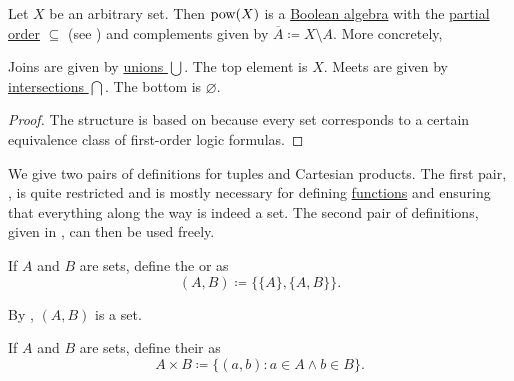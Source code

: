 \begin{proposition}\label{thm:boolean_algebra_of_subsets}
  Let \( X \) be an arbitrary set. Then \( \operatorname{pow}(X) \) is a \hyperref[def:boolean_algebra]{Boolean algebra} with the \hyperref[def:poset]{partial order} \( \subseteq \) (see ) and complements given by \( \overline{A} \coloneqq X \setminus A \). More concretely,
  \begin{thmenum}
     Joins are given by \hyperref[def:set_union]{unions \( \bigcup \)}.
     The top element is \( X \).
     Meets are given by \hyperref[def:set_intersection]{intersections \( \bigcap \)}.
     The bottom is \( \varnothing \).
  \end{thmenum}
\end{proposition}
\begin{proof}
  The structure is based on  because every set corresponds to a certain equivalence class of first-order logic formulas.
\end{proof}

\begin{remark}\label{rem:binary_vs_arbitrary_tuples}
  We give two pairs of definitions for tuples and Cartesian products. The first pair, , is quite restricted and is mostly necessary for defining \hyperref[def:function]{functions} and ensuring that everything along the way is indeed a set. The second pair of definitions, given in , can then be used freely.
\end{remark}

\begin{definition}\label{def:kuratowski_pair}
  If \( A \) and \( B \) are sets, define the  or  as
  \begin{equation*}
    (A, B) \coloneqq \{ \{ A \}, \{ A, B \} \}.
  \end{equation*}

  By , \( (A, B) \) is a set.
\end{definition}

\begin{definition}\label{def:binary_cartesian_product}
  If \( A \) and \( B \) are sets, define their  as
  \begin{equation*}
    A \times B \coloneqq \{ (a, b) \colon a \in A \land b \in B \}.
  \end{equation*}
\end{definition}

